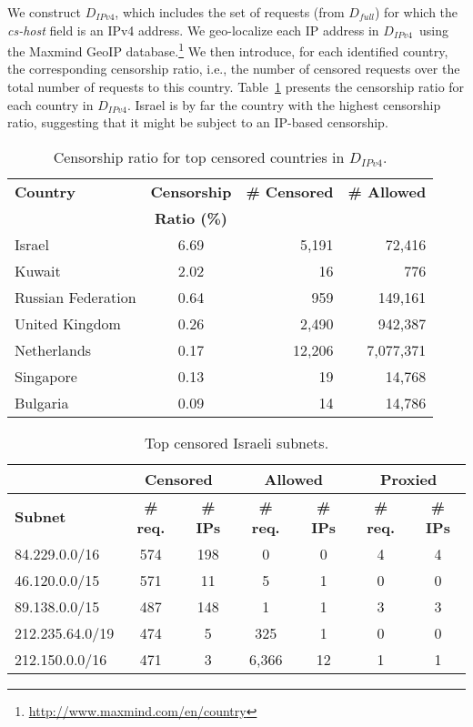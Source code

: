 \documentclass{sig-alternate-2013}
\def\df{$D_{full}$\xspace}
\def\dipv4{$D_{IPv4}$\xspace}
\begin{document}
We construct \dipv4, which includes the set of requests (from \df) for which the {\em cs-host} field is an IPv4 address. We geo-localize each IP address in \dipv4\ using the Maxmind GeoIP database.\footnote{\url{http://www.maxmind.com/en/country}} We then introduce, for each identified country, the corresponding censorship ratio, i.e., the number of censored requests over the total number of requests to this country.  Table~\ref{tab:ip_requests_countries} presents the censorship ratio for each country in \dipv4. Israel is by far the country with the highest censorship ratio, suggesting that it might be subject to an IP-based censorship. 



\begin{table}[t!]
\small
\centering
\begin{tabular}{|l|c|r|r|} \hline 
{\bf Country} &  {\bf Censorship} & {\bf \# Censored } &  {\bf \# Allowed}   \\ 
 & {\bf Ratio (\%)} & & \\ \hline
Israel & 6.69 & 5,191 & 72,416 \\ 
Kuwait & 2.02 & 16 & 776 \\ 
Russian Federation & 0.64 & 959 & 149,161 \\ 
United Kingdom & 0.26 & 2,490 & 942,387 \\ 
Netherlands & 0.17 & 12,206 & 7,077,371 \\ 
Singapore & 0.13 & 19 & 14,768 \\ 
Bulgaria & 0.09 & 14 & 14,786 \\ 
\hline
\end{tabular} 
\caption{Censorship ratio for top censored countries in \dipv4.}
\label{tab:ip_requests_countries}
\end{table} 



\begin{table}[t!]
\small
\centering
\begin{tabular}{|l|cc|cc|cc|} \hline
 &  \multicolumn{2}{c|}{{\bf Censored }}  & \multicolumn{2}{c|}{{\bf Allowed }} & \multicolumn{2}{c|}{{\bf Proxied }} \\ \hline
{\bf Subnet} &  {\bf \# req.} & {\bf \#  IPs} &  {\bf \# req.} & {\bf \#  IPs} &  {\bf \# req.} & {\bf \#  IPs}  \\ \hline
84.229.0.0/16 & 574 & 198 & 0 & 0 & 4 & 4 \\ \hline
46.120.0.0/15 & 571 & 11 & 5 & 1 & 0 & 0  \\ \hline
89.138.0.0/15 & 487 & 148 & 1 & 1 & 3 & 3  \\ \hline
212.235.64.0/19 & 474 & 5 & 325 & 1 & 0 & 0  \\ \hline
212.150.0.0/16 & 471 & 3 & 6,366 & 12 & 1 & 1   \\ \hline
\end{tabular} 
\caption{Top censored Israeli subnets.}
\label{tab:top_censored_israel_subnets}
\end{table} 
\end{document}

